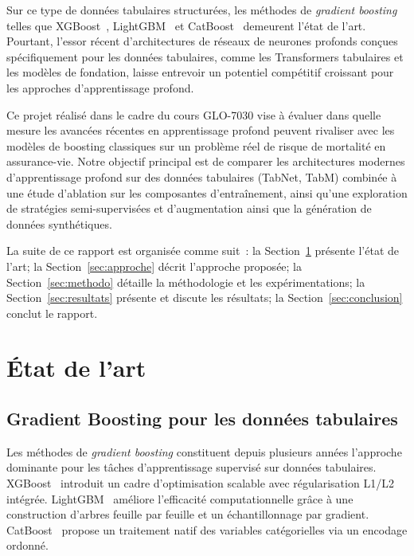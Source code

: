 \documentclass[conference]{IEEEtran}
\begin{document}
Sur ce type de données tabulaires structurées, les méthodes de \textit{gradient boosting} telles que XGBoost~\cite{chen2016xgboost}, LightGBM~\cite{ke2017lightgbm} et CatBoost~\cite{prokhorenkova2018catboost} demeurent l'état de l'art. Pourtant, l'essor récent d'architectures de réseaux de neurones profonds conçues spécifiquement pour les données tabulaires, comme les Transformers tabulaires et les modèles de fondation, laisse entrevoir un potentiel compétitif croissant pour les approches d'apprentissage profond.

Ce projet réalisé dans le cadre du cours GLO-7030 vise à évaluer dans quelle mesure les avancées récentes en apprentissage profond peuvent rivaliser avec  les modèles de boosting classiques sur un problème réel de risque de mortalité en assurance-vie. Notre objectif principal est de comparer les architectures modernes d'apprentissage profond sur des données tabulaires (TabNet, TabM) combinée à une étude d'ablation sur les composantes d'entraînement, ainsi qu'une exploration de stratégies semi-supervisées et d'augmentation ainsi que la génération de données synthétiques.

La suite de ce rapport est organisée comme suit~: la Section~\ref{sec:etat_art} présente l'état de l'art; la Section~\ref{sec:approche} décrit l'approche proposée; la Section~\ref{sec:methodo} détaille la méthodologie et les expérimentations; la Section~\ref{sec:resultats} présente et discute les résultats; la Section~\ref{sec:conclusion} conclut le rapport.

\section{État de l'art}
\label{sec:etat_art}

\subsection{Gradient Boosting pour les données tabulaires}

Les méthodes de \textit{gradient boosting} constituent depuis plusieurs années l'approche dominante pour les tâches d'apprentissage supervisé sur données tabulaires. XGBoost~\cite{chen2016xgboost}
introduit un cadre d'optimisation scalable avec régularisation L1/L2 intégrée. LightGBM~\cite{ke2017lightgbm} améliore l'efficacité computationnelle grâce à une construction d'arbres feuille par feuille et un échantillonnage par gradient. CatBoost~\cite{prokhorenkova2018catboost} propose un traitement natif des variables catégorielles via un encodage ordonné.
\end{document}
